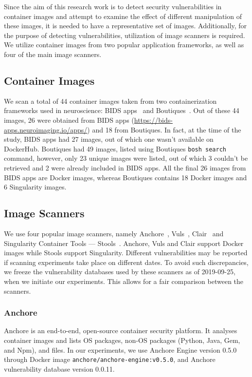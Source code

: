 \documentclass[a4paper,num-refs]{oup-contemporary}
\begin{document}
Since the aim of this research work is to detect security vulnerabilities
in container images and attempt to examine the effect of different
manipulation of these images, it is needed to have a representative set of
images. Additionally, for the purpose of detecting vulnerabilities,
utilization of image scanners is required. We utilize container
images from two popular application frameworks, as well as
four of the main image scanners.

\subsection{Container Images}

We scan a total of 44 container images taken from two containerization frameworks
used in neuroscience: BIDS
apps~\cite{gorgolewski2017bids} and Boutiques~\cite{glatard2018boutiques}.
Out of these 44 images, 26 were obtained from BIDS apps
(\url{https://bids-apps.neuroimaging.io/apps/}) 
and 18 from Boutiques. In fact, at the time of the study, BIDS apps had 27 images,
out of which one wasn't available on DockerHub. Boutiques had 49 images, listed using
Boutiques \texttt{bosh search} command,
however, only 23 unique images were listed, out of which 3 couldn't be retrieved and 2
were already included in BIDS apps. All the final 26 images
from BIDS apps are Docker images, whereas Boutiques contains 18 Docker images
and 6 Singularity images.

\subsection{Image Scanners}

We use four popular image scanners, namely Anchore~\cite{github_2019},
Vuls~\cite{future-architect_2019}, Clair~\cite{arminc_2019} and
Singularity Container Tools --- Stools~\cite{stools}. Anchore, Vuls and Clair support Docker
images while Stools support Singularity. Different vulnerabilities may be
reported if scanning experiments take place on different dates.
To avoid such discrepancies, we freeze the vulnerability
databases used by these scanners as of 2019-09-25, when we initiate our
experiments. This allows for a fair comparison between the scanners.

\subsubsection{Anchore}

Anchore is an end-to-end, open-source container security platform. It
analyses container images and lists OS
packages, non-OS packages (Python, Java, Gem, and Npm), and files.
In our experiments, we use Anchore Engine version 0.5.0 through Docker image \texttt{anchore/anchore-engine:v0.5.0}, and
Anchore vulnerability database version 0.0.11.
\end{document}
